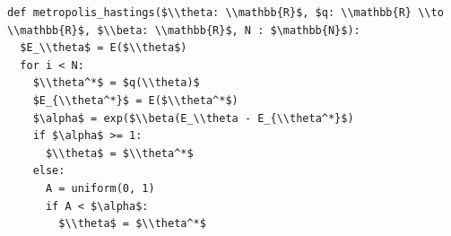 \documentclass[border=10pt]{standalone}
\begin{document}
\begin{lstlisting}
def metropolis_hastings($\\theta: \\mathbb{R}$, $q: \\mathbb{R} \\to \\mathbb{R}$, $\\beta: \\mathbb{R}$, N : $\mathbb{N}$):
  $E_\\theta$ = E($\\theta$)
  for i < N:
    $\\theta^*$ = $q(\\theta)$
    $E_{\\theta^*}$ = E($\\theta^*$)
    $\alpha$ = exp($\\beta(E_\\theta - E_{\\theta^*}$)
    if $\alpha$ >= 1:
      $\\theta$ = $\\theta^*$
    else:
      A = uniform(0, 1)
      if A < $\alpha$:
        $\\theta$ = $\\theta^*$
\end{lstlisting}
\end{document}
